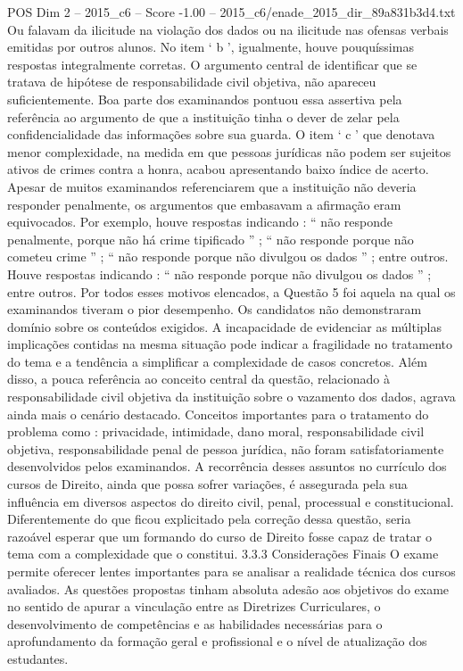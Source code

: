 \begin{textsample}{POS Dim 2 – 2015\_c6 – Score -1.00 – 2015\_c6/enade\_2015\_dir\_89a831b3d4.txt}
Ou falavam da ilicitude na violação dos dados ou na ilicitude nas ofensas verbais emitidas por outros alunos.
No item ‘ b ’, igualmente, houve pouquíssimas respostas integralmente corretas.
O argumento central de identificar que se tratava de hipótese de responsabilidade civil objetiva, não apareceu suficientemente.
Boa parte dos examinandos pontuou essa assertiva pela referência ao argumento de que a instituição tinha o dever de zelar pela confidencialidade das informações sobre sua guarda.
O item ‘ c ’ que denotava menor complexidade, na medida em que pessoas jurídicas não podem ser sujeitos ativos de crimes contra a honra, acabou apresentando baixo índice de acerto.
Apesar de muitos examinandos referenciarem que a instituição não deveria responder penalmente, os argumentos que embasavam a afirmação eram equivocados.
Por exemplo, houve respostas indicando : “ não responde penalmente, porque não há crime tipificado ” ; “ não responde porque não cometeu crime ” ; “ não responde porque não divulgou os dados ” ; entre outros.
Houve respostas indicando : “ não responde porque não divulgou os dados ” ; entre outros.
Por todos esses motivos elencados, a Questão 5 foi aquela na qual os examinandos tiveram o pior desempenho.
Os candidatos não demonstraram domínio sobre os conteúdos exigidos.
A incapacidade de evidenciar as múltiplas implicações contidas na mesma situação pode indicar a fragilidade no tratamento do tema e a tendência a simplificar a complexidade de casos concretos.
Além disso, a pouca referência ao conceito central da questão, relacionado à responsabilidade civil objetiva da instituição sobre o vazamento dos dados, agrava ainda mais o cenário destacado.
Conceitos importantes para o tratamento do problema como : privacidade, intimidade, dano moral, responsabilidade civil objetiva, responsabilidade penal de pessoa jurídica, não foram satisfatoriamente desenvolvidos pelos examinandos.
A recorrência desses assuntos no currículo dos cursos de Direito, ainda que possa sofrer variações, é assegurada pela sua influência em diversos aspectos do direito civil, penal, processual e constitucional.
Diferentemente do que ficou explicitado pela correção dessa questão, seria razoável esperar que um formando do curso de Direito fosse capaz de tratar o tema com a complexidade que o constitui. 3.3.3 Considerações Finais O exame permite oferecer lentes importantes para se analisar a realidade técnica dos cursos avaliados.
As questões propostas tinham absoluta adesão aos objetivos do exame no sentido de apurar a vinculação entre as Diretrizes Curriculares, o desenvolvimento de competências e as habilidades necessárias para o aprofundamento da formação geral e profissional e o nível de atualização dos estudantes.

\end{textsample}
